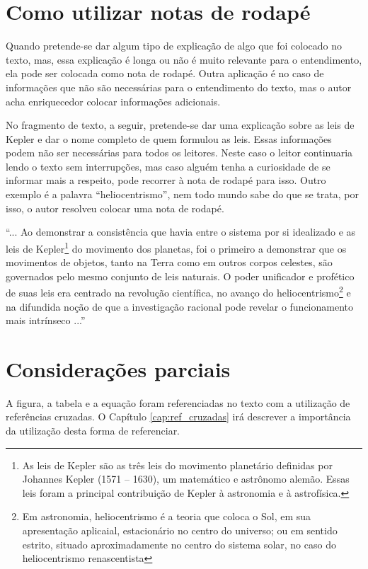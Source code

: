 \documentclass[
        oneside,      %
        english,			
        brazil			 
        ]{configcefetmglpd}
\begin{document}
\section{Como utilizar notas de rodapé}
Quando pretende-se dar algum tipo de explicação de algo que foi colocado no texto, mas, essa explicação é longa ou não é muito relevante para o entendimento, ela pode ser colocada como nota de rodapé. Outra aplicação é no caso de informações que não são necessárias para o entendimento do texto, mas o autor acha enriquecedor colocar informações adicionais.

No fragmento de texto, a seguir, pretende-se dar uma explicação sobre as leis de Kepler e dar o nome completo de quem formulou as leis. Essas informações podem não ser necessárias para todos os leitores. Neste caso o leitor continuaria lendo o texto sem interrupções, mas caso alguém tenha a curiosidade de se informar mais a respeito, pode recorrer à nota de rodapé para isso. Outro exemplo é a palavra “heliocentrismo”, nem todo mundo sabe do que se trata, por isso, o autor resolveu colocar uma nota de rodapé.

“... Ao demonstrar a consistência que havia entre o sistema por si idealizado e as leis de Kepler\footnote{As leis de Kepler são as três leis do movimento planetário definidas por Johannes Kepler (1571 – 1630), um matemático e astrônomo alemão. Essas leis foram a principal contribuição de Kepler à astronomia e à astrofísica.}  do movimento dos planetas, foi o primeiro a demonstrar que os movimentos de objetos, tanto na Terra como em outros corpos celestes, são governados pelo mesmo conjunto de leis naturais. O poder unificador e profético de suas leis era centrado na revolução científica, no avanço do heliocentrismo\footnote{Em astronomia, heliocentrismo é a teoria que coloca o Sol, em sua apresentação aplicaial, estacionário no centro do universo; ou em sentido estrito, situado aproximadamente no centro do sistema solar, no caso do heliocentrismo renascentista}  e na difundida noção de que a investigação racional pode revelar o funcionamento mais intrínseco ...” %

\section{Considerações parciais}
A figura, a tabela e a equação foram referenciadas no texto com a utilização de referências cruzadas. O Capítulo \ref{cap:ref_cruzadas} irá descrever a importância da utilização desta forma de referenciar.
\end{document}
